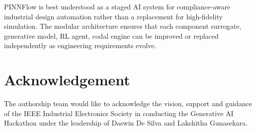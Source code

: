 \documentclass[conference]{IEEEtran}
\begin{document}
PINNFlow is best understood as a staged AI system for compliance-aware industrial design automation rather than a replacement for high-fidelity simulation. The modular architecture ensures that each component surrogate, generative model, RL agent, codal engine can be improved or replaced independently as engineering requirements evolve.
 
\section*{Acknowledgement}

The authorship team would like to acknowledge the vision, support and guidance of the IEEE Industrial Electronics Society in conducting the Generative AI Hackathon under the leadership of Daswin De Silva and Lakshitha Gunasekara.
 
\balance




 
\end{document}
